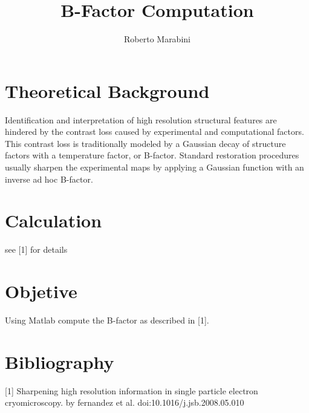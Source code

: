 \documentclass[a4paper,10pt]{article}
\title{B-Factor Computation}
\author{Roberto Marabini}
\date{}
\begin{document}
\maketitle

\section{Theoretical Background}

Identification and interpretation of high resolution structural features are hindered by the contrast loss caused by experimental and computational factors. This contrast loss is traditionally modeled by a Gaussian decay of structure factors with a temperature factor, or B-factor. Standard restoration procedures usually sharpen the experimental maps by applying a Gaussian function with an inverse ad hoc B-factor.

\section {Calculation}

see [1] for details

\section {Objetive}
Using Matlab compute the B-factor  as described in [1].

\section {Bibliography}
[1] Sharpening high resolution information in single particle electron cryomicroscopy. by fernandez et al. doi:10.1016/j.jsb.2008.05.010
\end{document}
